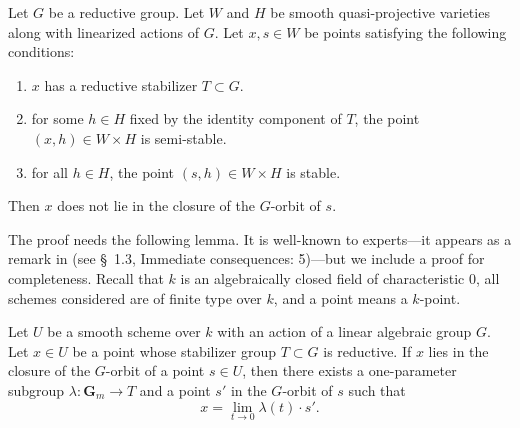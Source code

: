 \documentclass[reqno]{amsart}
\renewcommand{\k}{k}
\renewcommand{\to}{{\longrightarrow}}
\numberwithin{equation}{section}
\newcommand{\G}{\mathbf{G}}
\begin{document}
\begin{proposition}\label{prop:gitproduct}
  Let $G$ be a reductive group.
  Let $W$ and $H$ be smooth quasi-projective varieties along with linearized actions of $G$.
  Let $x, s \in W$ be points satisfying the following conditions:
  \begin{enumerate}
  \item $x$ has a reductive stabilizer $T \subset G$.
  \item for some $h \in H$ fixed by the identity component of $T$, the point $(x, h) \in W \times H$ is semi-stable.
  \item for all $h \in H$, the point $(s, h) \in W \times H$ is stable.
  \end{enumerate}
  Then $x$ does not lie in the closure of the $G$-orbit of $s$.
\end{proposition}
The proof needs the following lemma.
It is well-known to experts---it appears as a remark in \cite{alp.hal.ryd:20} (see \S~1.3, Immediate consequences: 5)---but we include a proof for completeness.
Recall that $\k$ is an algebraically closed field of characteristic 0, all schemes considered are of finite type over $\k$, and a point means a $\k$-point.
\begin{lemma}\label{prop:oneparam}
  Let \(U\) be a smooth scheme over $\k$ with an action of a linear algebraic group $G$.
  Let $x \in U$ be a point whose stabilizer group $T \subset G$ is reductive.
  If $x$ lies in the closure of the $G$-orbit of a point $s \in U$, then there exists a one-parameter subgroup $\lambda \colon \G_m \to T$ and a point $s'$ in the $G$-orbit of $s$ such that
  \[ x = \lim_{t \to 0} \lambda(t) \cdot s'.\]
\end{lemma}
\end{document}
